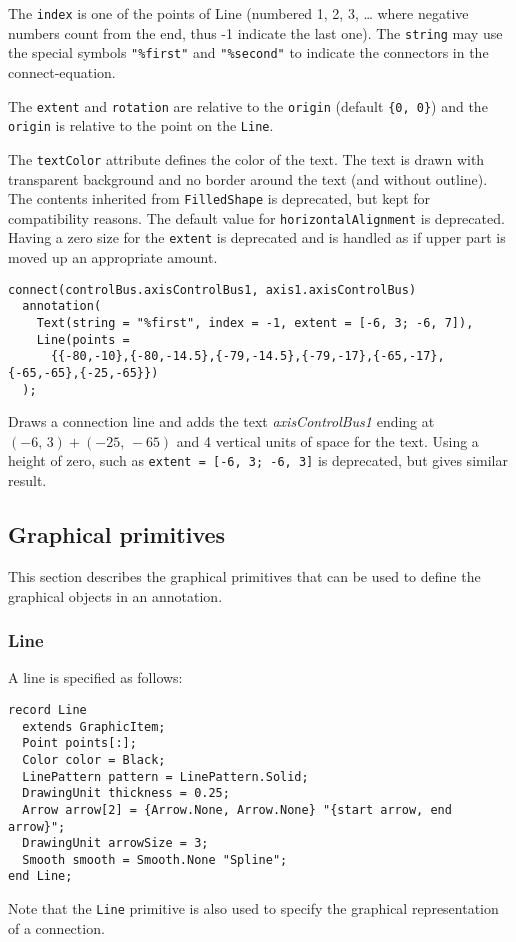The \lstinline!index! is one of the points of Line (numbered 1, 2, 3, \ldots{} where negative numbers count from the end, thus -1 indicate the last one).  The \lstinline!string! may use the special symbols \lstinline!"%first"! and \lstinline!"%second"! to indicate the connectors in the connect-equation.

The \lstinline!extent! and \lstinline!rotation! are relative to the \lstinline!origin! (default \lstinline!{0, 0}!) and the \lstinline!origin! is relative to the point on the \lstinline!Line!.

The \lstinline!textColor! attribute defines the color of the text.  The text is drawn with transparent background and no border around the text (and without outline).  The contents inherited from \lstinline!FilledShape! is deprecated, but kept for compatibility reasons.  The default value for \lstinline!horizontalAlignment! is deprecated.  Having a zero size for the \lstinline!extent! is deprecated and is handled as if upper part is moved up an appropriate amount.

\begin{example}
\begin{lstlisting}[language=modelica]
connect(controlBus.axisControlBus1, axis1.axisControlBus)
  annotation(
    Text(string = "%first", index = -1, extent = [-6, 3; -6, 7]),
    Line(points =
      {{-80,-10},{-80,-14.5},{-79,-14.5},{-79,-17},{-65,-17},{-65,-65},{-25,-65}})
  );
\end{lstlisting}
Draws a connection line and adds the text \emph{axisControlBus1} ending at $(-6,\, 3) + (-25,\, -65)$ and 4 vertical units of space for the text.
Using a height of zero, such as \lstinline!extent = [-6, 3; -6, 3]! is deprecated, but gives similar result.
\end{example}

\subsection{Graphical primitives}\label{graphical-primitives}

This section describes the graphical primitives that can be used to
define the graphical objects in an annotation.

\subsubsection{Line}\label{line}

A line is specified as follows:
\begin{lstlisting}[language=modelica]
record Line
  extends GraphicItem;
  Point points[:];
  Color color = Black;
  LinePattern pattern = LinePattern.Solid;
  DrawingUnit thickness = 0.25;
  Arrow arrow[2] = {Arrow.None, Arrow.None} "{start arrow, end arrow}";
  DrawingUnit arrowSize = 3;
  Smooth smooth = Smooth.None "Spline";
end Line;
\end{lstlisting}%
Note that the \lstinline!Line! primitive is also used to specify the graphical representation of a connection.

